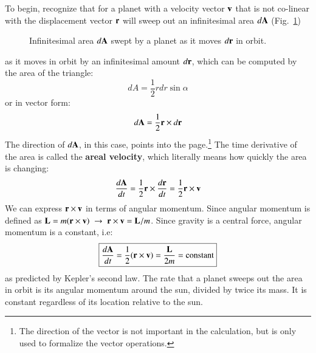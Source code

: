 \documentclass{../../../oss-handout}
\newcommand{\mb}[1]{\ensuremath\mathbf{#1}}
\begin{document}
To begin, recognize that for a planet with a velocity vector $\mb{v}$ that is
not co-linear with the displacement vector $\mb{r}$ will sweep out an
infinitesimal area $d\mb{A}$ (Fig.~\ref{fig:dA})
\begin{figure}[ht]
  \centering
  \caption{Infinitesimal area $d\mb{A}$ swept by a planet as it moves
    $d\mb{r}$ in orbit.}
  \label{fig:dA}
\end{figure}
as it moves in orbit by an infinitesimal amount $d\mb{r}$, which can be
computed by the area of the triangle:
\begin{equation}
  dA=\frac{1}{2}rdr\sin\alpha
\end{equation}
or in vector form:
\begin{equation}
  d\mb{A}=\frac{1}{2}\mb{r}\times d\mb{r}
\end{equation}
The direction of $d\mb{A}$, in this case, points into the
page.\footnote{The direction of the vector is not important in the calculation,
  but is only used to formalize the vector operations.} The time derivative of
the area is called the \textbf{areal velocity}, which literally means how
quickly the area is changing:
\begin{equation}
  \frac{d\mb{A}}{dt}
  =\frac{1}{2}\mb{r}\times\frac{d\mb{r}}{dt}
  =\frac{1}{2}\mb{r}\times\mb{v}
\end{equation}
We can express $\mb{r}\times\mb{v}$ in terms of angular momentum. Since angular
momentum is defined as $\mb{L}=m(\mb{r}\times\mb{v})\;\rightarrow\;
\mb{r}\times\mb{v}=\mb{L}/m$. Since gravity is a central force, angular
momentum is a constant, i.e:
\begin{equation}
  \boxed{\frac{d\mb{A}}{dt}
    =\frac{1}{2}(\mb{r}\times\mb{v})=\frac{\mb{L}}{2m}=
    \text{constant}
  }
  \label{constant}
\end{equation}
as predicted by Kepler's second law. The rate that a planet sweeps out the area
in orbit is its angular momentum around the sun, divided by twice its mass. It
is constant regardless of its location relative to the sun.
\end{document}
